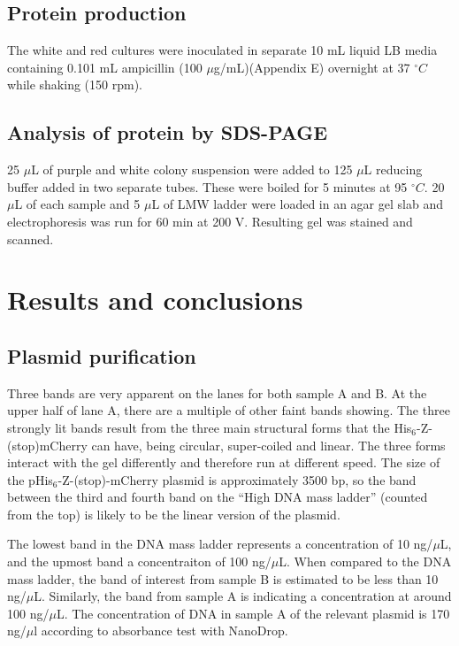 \documentclass[11pt,a4paper]{article}
\begin{document}
\subsection{Protein production}
The white and red cultures were inoculated in separate 10 mL liquid LB media containing 0.101 mL ampicillin (100 $\mu$g/mL)(Appendix E) overnight at 37 $^\circ C$ while shaking \linebreak(150 rpm). 

\subsection{Analysis of protein by SDS-PAGE}
25 $\mu$L of purple and white colony suspension were added to 125 $\mu$L reducing buffer added in two separate tubes. These were boiled for 5 minutes at 95 $^\circ C$. 20 $\mu$L of each sample and 5 $\mu$L of LMW ladder were loaded in an agar gel slab and electrophoresis was run for 60 min at 200 V. Resulting gel was stained and scanned.

\section{Results and conclusions}
 \subsection{Plasmid purification}
Three bands are very apparent on the lanes for both sample A and B. At the upper half of lane A, there are a multiple of other faint bands showing. The three strongly lit bands result from the three main structural forms that the His$_6$-Z-(stop)mCherry can have, being circular, super-coiled and linear. The three forms interact with the gel differently and therefore run at different speed. The size of the pHis$_6$-Z-(stop)-mCherry plasmid is approximately 3500 bp, so the band between the third and fourth band on the “High DNA mass ladder” (counted from the top) is likely to be the linear version of the plasmid. 

The lowest band in the DNA mass ladder represents a concentration of 10 ng/$\mu$L, and the upmost band a concentraiton of 100 ng/$\mu$L. When compared to the DNA mass ladder, the band of interest from sample B is estimated to be less than 10 ng/$\mu$L. Similarly, the band from sample A is indicating a concentration at around 100 ng/$\mu$L. The concentration of DNA in sample A of the relevant plasmid is 170 ng/$\mu$l according to absorbance test with NanoDrop. 
\end{document}
